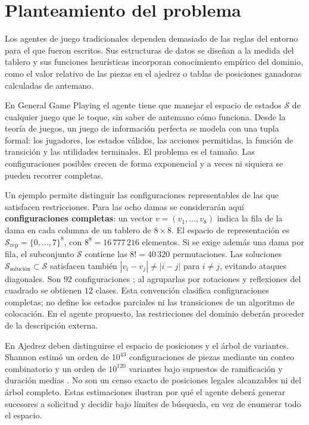 \section{Planteamiento del problema}

Los agentes de juego tradicionales dependen demasiado de las reglas del entorno para el que fueron escritos. Sus estructuras de datos se diseñan a la medida del tablero y sus funciones heurísticas incorporan conocimiento empírico del dominio, como el valor relativo de las piezas en el ajedrez o tablas de posiciones ganadoras calculadas de antemano.

En General Game Playing el agente tiene que manejar el espacio de estados $\mathcal{S}$ de cualquier juego que le toque, sin saber de antemano cómo funciona. Desde la teoría de juegos, un juego de información perfecta se modela con una tupla formal: los jugadores, los estados válidos, las acciones permitidas, la función de transición y las utilidades terminales. El problema es el tamaño. Las configuraciones posibles crecen de forma exponencial y a veces ni siquiera se pueden recorrer completas.

Un ejemplo permite distinguir las configuraciones representables de las que satisfacen restricciones. Para las ocho damas se considerarán aquí \textbf{configuraciones completas}: un vector $v=(v_1,\dots,v_8)$ indica la fila de la dama en cada columna de un tablero de $8\times8$. El espacio de representación es $\mathcal S_{\text{rep}}=\{0,\dots,7\}^8$, con $8^8=16\,777\,216$ elementos. Si se exige además una dama por fila, el subconjunto $\mathcal S$ contiene las $8!=40\,320$ permutaciones. Las soluciones $\mathcal S_{\text{solución}}\subset\mathcal S$ satisfacen también $|v_i-v_j|\ne|i-j|$ para $i\ne j$, evitando ataques diagonales. Son $92$ configuraciones \cite{GoogleNQueens}; al agruparlas por rotaciones y reflexiones del cuadrado se obtienen $12$ clases. Esta convención clasifica configuraciones completas; no define los estados parciales ni las transiciones de un algoritmo de colocación. En el agente propuesto, las restricciones del dominio deberán proceder de la descripción externa.

En Ajedrez deben distinguirse el espacio de posiciones y el árbol de variantes. Shannon estimó un orden de $10^{43}$ configuraciones de piezas mediante un conteo combinatorio y un orden de $10^{120}$ variantes bajo supuestos de ramificación y duración medias \cite{Shannon1950}. No son un censo exacto de posiciones legales alcanzables ni del árbol completo. Estas estimaciones ilustran por qué el agente deberá generar sucesores a solicitud y decidir bajo límites de búsqueda, en vez de enumerar todo el espacio.

